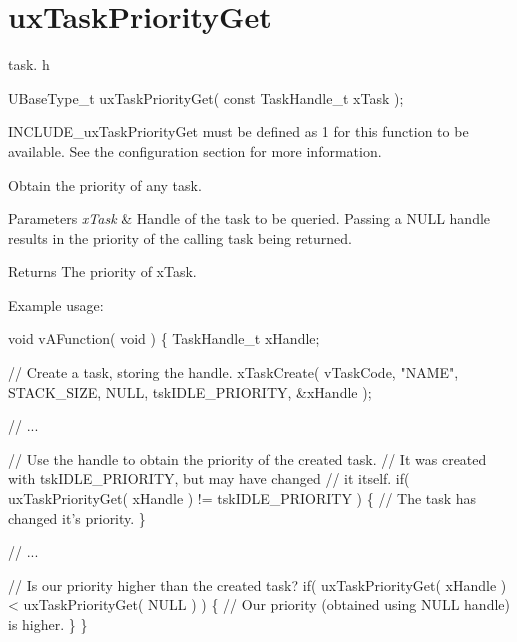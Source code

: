 \hypertarget{group__ux_task_priority_get}{}\section{ux\+Task\+Priority\+Get}
\label{group__ux_task_priority_get}
task. h 
\begin{DoxyPre}UBaseType\_t uxTaskPriorityGet( const TaskHandle\_t xTask );\end{DoxyPre}


I\+N\+C\+L\+U\+D\+E\+\_\+ux\+Task\+Priority\+Get must be defined as 1 for this function to be available. See the configuration section for more information.

Obtain the priority of any task.


\begin{DoxyParams}{Parameters}
{\em x\+Task} & Handle of the task to be queried. Passing a N\+U\+LL handle results in the priority of the calling task being returned.\\
\hline
\end{DoxyParams}
\begin{DoxyReturn}{Returns}
The priority of x\+Task.
\end{DoxyReturn}
Example usage\+: 
\begin{DoxyPre}
void vAFunction( void )
\{
TaskHandle\_t xHandle;\end{DoxyPre}



\begin{DoxyPre}    // Create a task, storing the handle.
    xTaskCreate( vTaskCode, "NAME", STACK\_SIZE, NULL, tskIDLE\_PRIORITY, \&xHandle );\end{DoxyPre}



\begin{DoxyPre}    // ...\end{DoxyPre}



\begin{DoxyPre}    // Use the handle to obtain the priority of the created task.
    // It was created with tskIDLE\_PRIORITY, but may have changed
    // it itself.
    if( uxTaskPriorityGet( xHandle ) != tskIDLE\_PRIORITY )
    \{
     // The task has changed it's priority.
    \}\end{DoxyPre}



\begin{DoxyPre}    // ...\end{DoxyPre}



\begin{DoxyPre}    // Is our priority higher than the created task?
    if( uxTaskPriorityGet( xHandle ) < uxTaskPriorityGet( NULL ) )
    \{
     // Our priority (obtained using NULL handle) is higher.
    \}
\}
  \end{DoxyPre}
 